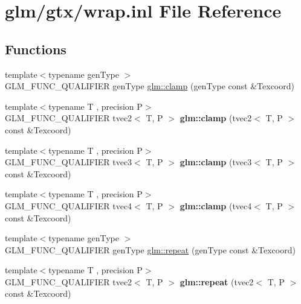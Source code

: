 \hypertarget{wrap_8inl}{\section{glm/gtx/wrap.inl File Reference}
\label{wrap_8inl}
}
\subsection*{Functions}
\begin{DoxyCompactItemize}
\item 
{\footnotesize template$<$typename gen\-Type $>$ }\\G\-L\-M\-\_\-\-F\-U\-N\-C\-\_\-\-Q\-U\-A\-L\-I\-F\-I\-E\-R gen\-Type \hyperlink{group__gtx__wrap_ga6c0cc6bd1d67ea1008d2592e998bad33}{glm\-::clamp} (gen\-Type const \&Texcoord)
\item 
\hypertarget{namespaceglm_a44107199d20102cbd6c9b64f72cfba55}{{\footnotesize template$<$typename T , precision P$>$ }\\G\-L\-M\-\_\-\-F\-U\-N\-C\-\_\-\-Q\-U\-A\-L\-I\-F\-I\-E\-R tvec2$<$ T, P $>$ {\bfseries glm\-::clamp} (tvec2$<$ T, P $>$ const \&Texcoord)}\label{namespaceglm_a44107199d20102cbd6c9b64f72cfba55}

\item 
\hypertarget{namespaceglm_a020c0df6915c1ede86ffbd807a5b47c1}{{\footnotesize template$<$typename T , precision P$>$ }\\G\-L\-M\-\_\-\-F\-U\-N\-C\-\_\-\-Q\-U\-A\-L\-I\-F\-I\-E\-R tvec3$<$ T, P $>$ {\bfseries glm\-::clamp} (tvec3$<$ T, P $>$ const \&Texcoord)}\label{namespaceglm_a020c0df6915c1ede86ffbd807a5b47c1}

\item 
\hypertarget{namespaceglm_a42bda64124cb7e94d86c1edb6025a932}{{\footnotesize template$<$typename T , precision P$>$ }\\G\-L\-M\-\_\-\-F\-U\-N\-C\-\_\-\-Q\-U\-A\-L\-I\-F\-I\-E\-R tvec4$<$ T, P $>$ {\bfseries glm\-::clamp} (tvec4$<$ T, P $>$ const \&Texcoord)}\label{namespaceglm_a42bda64124cb7e94d86c1edb6025a932}

\item 
{\footnotesize template$<$typename gen\-Type $>$ }\\G\-L\-M\-\_\-\-F\-U\-N\-C\-\_\-\-Q\-U\-A\-L\-I\-F\-I\-E\-R gen\-Type \hyperlink{group__gtx__wrap_ga809650c6310ea7c42666e918c117fb6f}{glm\-::repeat} (gen\-Type const \&Texcoord)
\item 
\hypertarget{namespaceglm_a3f9751f6712e70e7bee9e86edaa23dc3}{{\footnotesize template$<$typename T , precision P$>$ }\\G\-L\-M\-\_\-\-F\-U\-N\-C\-\_\-\-Q\-U\-A\-L\-I\-F\-I\-E\-R tvec2$<$ T, P $>$ {\bfseries glm\-::repeat} (tvec2$<$ T, P $>$ const \&Texcoord)}\label{namespaceglm_a3f9751f6712e70e7bee9e86edaa23dc3}


\end{DoxyCompactItemize}
